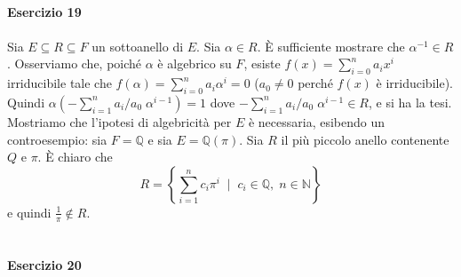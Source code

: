 \documentclass[12pt,a4paper]{report}
\theoremstyle{definition}
\begin{document}
\ 
\\
\noindent\textbf{Esercizio 19}\\
\\
Sia $E \subseteq R \subseteq F$ un sottoanello di $E$. Sia $\alpha \in R$. È sufficiente mostrare che $\alpha^{-1} \in R$. Osserviamo che, poiché $\alpha$ è algebrico su $F$, esiste $f(x)= \sum_{i=0}^n a_i x^i$ irriducibile tale che $f(\alpha)= \sum_{i=0}^n a_i \alpha^i = 0$ ($a_0 \neq 0$ perché $f(x)$ è irriducibile).\\
Quindi $\alpha (-\sum_{i=1}^n a_i/a_0 \; \alpha^{i-1})=1$ dove $-\sum_{i=1}^n a_i/a_0 \; \alpha^{i-1} \in R$, e si ha la tesi.\\
Mostriamo che l'ipotesi di algebricità per $E$ è necessaria, esibendo un controesempio: sia $F=\mathbb{Q}$ e sia $E=\mathbb{Q}(\pi)$. Sia $R$ il più piccolo anello contenente $Q$ e $\pi$. È chiaro che 
$$R=\left\{ \sum_{i=1}^n c_i \pi^i \; \mid \; c_i \in \mathbb{Q}, \; n \in \mathbb{N} \right\}$$
e quindi $\frac{1}{\pi} \not\in R$.
\\
\\
\\
\noindent\textbf{Esercizio 20}
\end{document}
